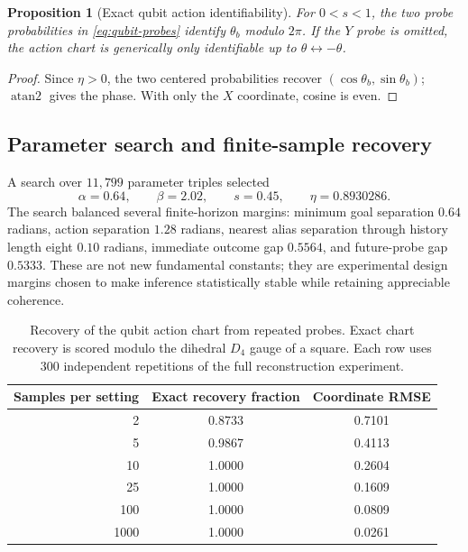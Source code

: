 \documentclass[11pt]{article}
\newtheorem{proposition}[theorem]{Proposition}
\theoremstyle{definition}
\theoremstyle{remark}
\begin{document}
\begin{proposition}[Exact qubit action identifiability]
For \(0<s<1\), the two probe probabilities in
\cref{eq:qubit-probes} identify \(\theta_b\) modulo \(2\pi\). If the \(Y\)
probe is omitted, the action chart is generically only identifiable up to
\(\theta\leftrightarrow-\theta\).
\end{proposition}
\begin{proof}
Since \(\eta>0\), the two centered probabilities recover
\((\cos\theta_b,\sin\theta_b)\); \(\operatorname{atan2}\) gives the phase.
With only the \(X\) coordinate, cosine is even.
\end{proof}

\subsection{Parameter search and finite-sample recovery}

A search over \(11{,}799\) parameter triples selected
\[
\alpha=0.64,\qquad\beta=2.02,\qquad s=0.45,
\qquad \eta=0.8930286.
\]
The search balanced several finite-horizon margins: minimum goal separation
\(0.64\) radians, action separation \(1.28\) radians, nearest alias separation
through history length eight \(0.10\) radians, immediate outcome gap
\(0.5564\), and future-probe gap \(0.5333\). These are not new fundamental
constants; they are experimental design margins chosen to make inference
statistically stable while retaining appreciable coherence.

\begin{table}[H]
\centering
\caption{Recovery of the qubit action chart from repeated probes. Exact chart
recovery is scored modulo the dihedral \(D_4\) gauge of a square. Each row uses
\(300\) independent repetitions of the full reconstruction experiment.}
\label{tab:qubit-recovery}
\begin{tabular}{rcc}
\toprule
Samples per setting & Exact recovery fraction & Coordinate RMSE\\
\midrule
2    & 0.8733 & 0.7101\\
5    & 0.9867 & 0.4113\\
10   & 1.0000 & 0.2604\\
25   & 1.0000 & 0.1609\\
100  & 1.0000 & 0.0809\\
1000 & 1.0000 & 0.0261\\
\bottomrule
\end{tabular}
\end{table}
\end{document}
